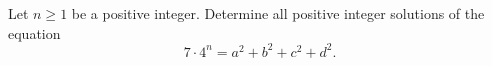 Let $n \geq 1$ be a positive integer. Determine all positive integer solutions of the equation
$$7 \cdot 4^n=a^2+b^2+c^2+d^2.$$